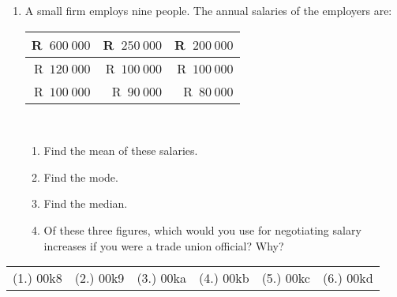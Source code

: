 \begin{eocexercises}{}
\begin{enumerate}[itemsep=6pt, label=\textbf{\arabic*}.]
  \item A small firm employs nine people. The annual salaries of the employers are:
\\
    \begin{center}
      \begin{tabular}{|r|r|r|} \hline
        R~$600~000$ & R~$250~000$ & R~$200~000$ \\\hline
        R~$120~000$ & R~$100~000$ & R~$100~000$ \\\hline
        R~$100~000$ &  R~$90~000$ &  R~$80~000$ \\\hline
      \end{tabular}
    \end{center}
\vspace {8pt}\\
    \begin{enumerate}[noitemsep, label=\textbf{(\alph*)} ]
    \item Find the mean of these salaries.
    \item Find the mode.
    \item Find the median.
    \item Of these three figures, which would you use for
      negotiating salary increases if you were a trade union
      official? Why?
    \end{enumerate}

  \end{enumerate}
\practiceinfo
\par 
\par \begin{tabular}[h]{cccccc}
(1.) 00k8&  (2.) 00k9&  (3.) 00ka&  (4.) 00kb&  (5.) 00kc&  (6.) 00kd\end{tabular}
\end{eocexercises}
